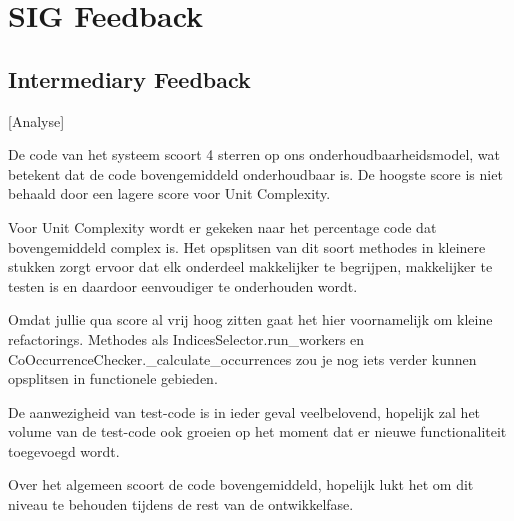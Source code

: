 \chapter{SIG Feedback}\label{sig_fb}
\section{Intermediary Feedback}
[Analyse]

De code van het systeem scoort 4 sterren op ons onderhoudbaarheidsmodel, wat betekent dat de code bovengemiddeld onderhoudbaar is. De hoogste score is niet behaald door een lagere score voor Unit Complexity.

Voor Unit Complexity wordt er gekeken naar het percentage code dat bovengemiddeld complex is. Het opsplitsen van dit soort methodes in kleinere stukken zorgt ervoor dat elk onderdeel makkelijker te begrijpen, makkelijker te testen is en daardoor eenvoudiger te onderhouden wordt.

Omdat jullie qua score al vrij hoog zitten gaat het hier voornamelijk om kleine refactorings. Methodes als IndicesSelector.run\_workers en CoOccurrenceChecker.\_calculate\_occurrences zou je nog iets verder kunnen opsplitsen in functionele gebieden.

De aanwezigheid van test-code is in ieder geval veelbelovend, hopelijk zal het volume van de test-code ook groeien op het moment dat er nieuwe functionaliteit toegevoegd wordt.

Over het algemeen scoort de code bovengemiddeld, hopelijk lukt het om dit niveau te behouden tijdens de rest van de ontwikkelfase.

